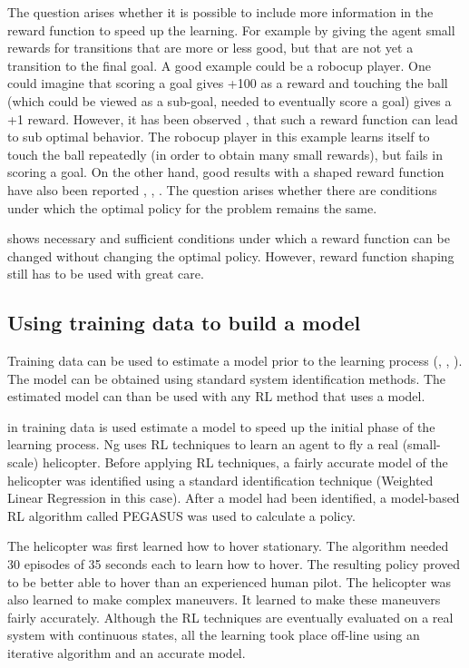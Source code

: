 \documentclass[a4paper,11pt]{mscLiterature}
\begin{document}
The question arises whether it is possible to include more information in the reward function to speed up the learning. For example by giving the agent small rewards for transitions that are more or less good, but that are not yet a transition to the final goal. A good example could be a robocup player. One could imagine that scoring a goal gives +100 as a reward and touching the ball (which could be viewed as a sub-goal, needed to eventually score a goal) gives a +1 reward. However, it has been observed \cite{RandlovAlstrom:98}, \cite{Ng:99} that such a reward function can lead to sub optimal behavior. The robocup player in this example learns itself to touch the ball repeatedly (in order to obtain many small rewards), but fails in scoring a goal. On the other hand, good results with a shaped reward function have also been reported \cite{DorigoColombetti:98}, \cite{Mataric:94}, \cite{RandlovAlstrom:98}. The question arises whether there are conditions under which the optimal policy for the problem remains the same. 

\cite{Ng:99} shows necessary and sufficient conditions under which a reward function can be changed without changing the optimal policy. However, reward function shaping still has to be used with great care.

	

\subsection{Using training data to build a model}
Training data can be used to estimate a model prior to the learning process (\cite{Ng:04}, \cite{Bakker:03}, \cite{AtkesonSchaal:97}). The model can be obtained using standard system identification methods. The estimated model can than be used with any RL method that uses a model.

in \cite{Ng:04} training data is used estimate a model to speed up the initial phase of the learning process. Ng uses RL techniques to learn an agent to fly a real (small-scale) helicopter. Before applying RL techniques, a fairly accurate model of the helicopter was identified using a standard identification technique (Weighted Linear Regression in this case). After a model had been identified, a model-based RL algorithm called \textsc{PEGASUS} was used to calculate a policy. 

The helicopter was first learned how to hover stationary. The algorithm needed 30 episodes of 35 seconds each to learn how to hover. The resulting policy proved to be better able to hover than an experienced human pilot. The helicopter was also learned to make complex maneuvers. It learned to make these maneuvers fairly accurately. Although the RL techniques are eventually evaluated on a real system with continuous states, all the learning took place off-line using an iterative algorithm and an accurate model. 
\end{document}
